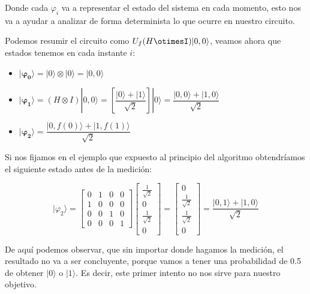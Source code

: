 \vspace{30pt}

Donde cada $\varphi_{i}$ va a representar el estado del sistema en cada momento, esto nos va a ayudar a analizar de forma determinista lo que ocurre en nuestro circuito.\newline

Podemos resumir el circuito como  $U_{f}(H\otimesI)|0,0\rangle$, veamos ahora que estados tenemos en cada instante $i$:

\begin{itemize}
    \item $\mathbf{|\varphi_{0}\rangle} = |0\rangle \otimes |0\rangle = |0,0\rangle$

    \item $\mathbf{|\varphi_{1}\rangle} = (H\otimes I)|0,0\rangle = \left[ \dfrac{|0\rangle + |1\rangle}{\sqrt{2}}\right] |0\rangle = \dfrac{|0,0\rangle+|1,0\rangle}{\sqrt{2}}$

    \item  $\mathbf{|\varphi_{2}\rangle} = \dfrac{|0,f(0)\rangle+|1,f(1)\rangle}{\sqrt{2}}$
\end{itemize}

Si nos fijamos en el ejemplo que expuesto al principio del algoritmo obtendríamos el siguiente estado antes de la medición:

\begin{equation}
    |\varphi_{2}\rangle=\begin{bmatrix}
        0 & 1 & 0 & 0 \\
        1 & 0 & 0 & 0 \\
        0 & 0 & 1 & 0 \\
        0 & 0 & 0 & 1
    \end{bmatrix}
    \begin{bmatrix}
        \frac{1}{\sqrt{2}} \\ 0 \\ \frac{1}{\sqrt{2}} \\ 0 
    \end{bmatrix} = 
    \begin{bmatrix}
        0 \\ \frac{1}{\sqrt{2}} \\ \frac{1}{\sqrt{2}} \\ 0 
    \end{bmatrix} = \dfrac{|0,1\rangle + |1,0\rangle}{\sqrt{2}}
\end{equation}

De aquí podemos observar, que sin importar donde hagamos la medición, el resultado no va a ser concluyente, porque vamos a tener una probabilidad de 0.5 de obtener $|0\rangle$ o $|1\rangle$. Es decir, este primer intento no nos sirve para nuestro objetivo. \newline

